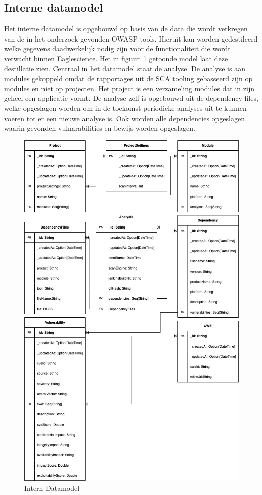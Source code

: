 \subsection{Interne datamodel}\label{subsec:interne-datamodel}
Het interne datamodel is opgebouwd op basis van de data die wordt verkregen van de in het onderzoek gevonden OWASP tools. Hieruit kan worden gedestileerd welke gegevens daadwerkelijk nodig zijn voor de functionaliteit die wordt verwacht binnen Eaglescience. Het in figuur~\ref{fig:SOUP-SoupApiDm} getoonde model laat deze destillatie zien. Centraal in het datamodel staat de analyse. De analyse is aan modules gekoppeld omdat de rapportages uit de SCA tooling gebasseerd zijn op modules en niet op projecten. Het project is een verzameling modules dat in zijn geheel een applicatie vormt. De analyse zelf is opgebouwd uit de dependency files, welke opgeslagen worden om in de toekomst periodieke analyses uit te kunnen voeren tot er een nieuwe analyse is. Ook worden alle dependencies opgeslagen waarin gevonden vulnarabilities en bewijs worden opgeslagen.

\begin{figure}[H]
    \myfloatalign
    \includegraphics[width=12cm]{gfx/SOUPAPI-SOUPAPI DM}
    \caption{Intern Datamodel}
    \label{fig:SOUP-SoupApiDm}
\end{figure}

